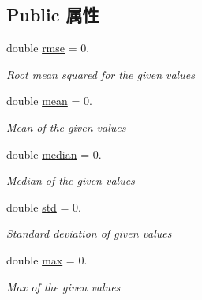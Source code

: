 \subsection*{Public 属性}
\begin{DoxyCompactItemize}
\item 
\mbox{\label{structov__eval_1_1Statistics_a86b2905802456b6a1d8b6bcacb9a9e39}} 
double \hyperlink{structov__eval_1_1Statistics_a86b2905802456b6a1d8b6bcacb9a9e39}{rmse} = 0.
\begin{DoxyCompactList}\small\item\em Root mean squared for the given values \end{DoxyCompactList}\item 
\mbox{\label{structov__eval_1_1Statistics_ab3fe9611541840f445f1e28a5181b2eb}} 
double \hyperlink{structov__eval_1_1Statistics_ab3fe9611541840f445f1e28a5181b2eb}{mean} = 0.
\begin{DoxyCompactList}\small\item\em Mean of the given values \end{DoxyCompactList}\item 
\mbox{\label{structov__eval_1_1Statistics_a44b7c68c982ad20d064bd2f6168e60be}} 
double \hyperlink{structov__eval_1_1Statistics_a44b7c68c982ad20d064bd2f6168e60be}{median} = 0.
\begin{DoxyCompactList}\small\item\em Median of the given values \end{DoxyCompactList}\item 
\mbox{\label{structov__eval_1_1Statistics_a955e40e0c9a32572c2d72815904d52be}} 
double \hyperlink{structov__eval_1_1Statistics_a955e40e0c9a32572c2d72815904d52be}{std} = 0.
\begin{DoxyCompactList}\small\item\em Standard deviation of given values \end{DoxyCompactList}\item 
\mbox{\label{structov__eval_1_1Statistics_a3c199c37bd66fa83acfe4eebc279dd34}} 
double \hyperlink{structov__eval_1_1Statistics_a3c199c37bd66fa83acfe4eebc279dd34}{max} = 0.
\begin{DoxyCompactList}\small\item\em Max of the given values \end{DoxyCompactList}\item 

\end{DoxyCompactItemize}
